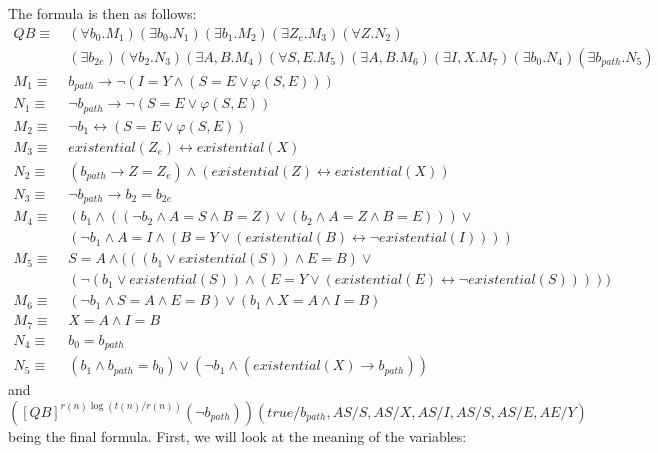 The formula is then as follows:
\[
    \begin{aligned}
        QB \equiv&~(\forall b_{0}.M_{1})(\exists b_{0}.N_{1})(\exists b_{1}.M_{2})(\exists Z_{e}.M_{3})(\forall Z.N_{2})\\
        &~(\exists b_{2e})(\forall b_{2}.N_{3})(\exists A, B.M_{4})(\forall S, E.M_{5})(\exists A, B.M_{6})(\exists I, X.M_{7})(\exists b_{0}.N_{4})(\exists b_{path}.N_{5}) \\
        M_{1} \equiv&~b_{path} \to \neg(I = Y \land (S = E \lor \varphi(S, E))) \\
        N_{1} \equiv&~\neg b_{path} \to \neg(S = E \lor \varphi(S, E)) \\
        M_{2} \equiv&~\neg b_{1} \leftrightarrow (S = E \lor \varphi(S, E)) \\
        M_{3} \equiv&~existential(Z_{e}) \leftrightarrow existential(X)\\
        N_{2} \equiv&~(b_{path} \to Z = Z_{e}) \land (existential(Z) \leftrightarrow existential(X))\\
        N_{3} \equiv&~ \neg b_{path} \to b_{2} = b_{2e}\\
        M_{4} \equiv&~(b_{1} \land ((\neg b_{2} \land A = S  \land B = Z) \lor (b_{2} \land A = Z \land B = E))) \lor \\
        &~(\neg b_{1} \land  A = I \land (B = Y \lor (existential(B) \leftrightarrow \neg existential(I)))) \\
        M_{5} \equiv&~S = A \land ((( b_{1} \lor existential(S)) \land E = B) \lor \\
        &~(\neg( b_{1} \lor existential(S)) \land (E = Y \lor (existential(E)\leftrightarrow \neg existential(S))))) \\
        M_{6} \equiv&~(\neg b_{1}  \land S = A \land E = B) \lor (b_{1} \land X = A \land I = B)\\
        M_{7} \equiv&~X = A \land I = B \\
        N_{4} \equiv&~b_{0} = b_{path} \\
        N_{5} \equiv&~(b_{1} \land b_{path} = b_{0}) \lor (\neg b_{1} \land (existential(X) \to b_{path}))
    \end{aligned}
\]
and $\left([QB]^{r(n)\log(t(n)/r(n))}(\neg b_{path})\right)(true / b_{path}, AS / S, AS / X, AS /I, AS /S, AS / E, AE / Y)$ being the final formula.
First, we will look at the meaning of the variables:
